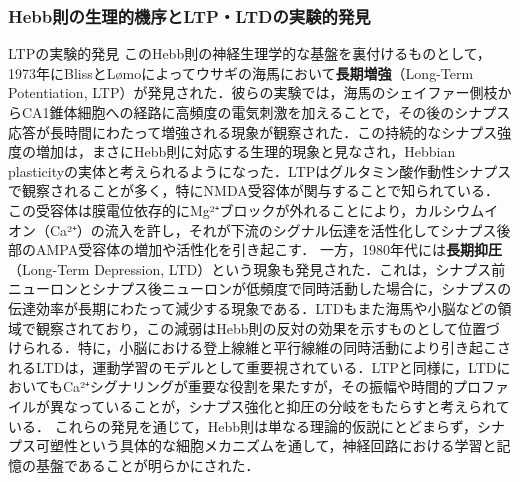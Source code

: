 \subsubsection{Hebb則の生理的機序とLTP・LTDの実験的発見}
LTPの実験的発見 \citep{Bliss1973-vj} \citep{Dudek1992-nz}
このHebb則の神経生理学的な基盤を裏付けるものとして，1973年にBlissとLømoによってウサギの海馬において\textbf{長期増強}（Long-Term Potentiation, LTP）が発見された．彼らの実験では，海馬のシェイファー側枝からCA1錐体細胞への経路に高頻度の電気刺激を加えることで，その後のシナプス応答が長時間にわたって増強される現象が観察された．この持続的なシナプス強度の増加は，まさにHebb則に対応する生理的現象と見なされ，Hebbian plasticityの実体と考えられるようになった．LTPはグルタミン酸作動性シナプスで観察されることが多く，特にNMDA受容体が関与することで知られている．この受容体は膜電位依存的にMg²⁺ブロックが外れることにより，カルシウムイオン（Ca²⁺）の流入を許し，それが下流のシグナル伝達を活性化してシナプス後部のAMPA受容体の増加や活性化を引き起こす．
一方，1980年代には\textbf{長期抑圧}（Long-Term Depression, LTD）という現象も発見された．これは，シナプス前ニューロンとシナプス後ニューロンが低頻度で同時活動した場合に，シナプスの伝達効率が長期にわたって減少する現象である．LTDもまた海馬や小脳などの領域で観察されており，この減弱はHebb則の反対の効果を示すものとして位置づけられる．特に，小脳における登上線維と平行線維の同時活動により引き起こされるLTDは，運動学習のモデルとして重要視されている．LTPと同様に，LTDにおいてもCa²⁺シグナリングが重要な役割を果たすが，その振幅や時間的プロファイルが異なっていることが，シナプス強化と抑圧の分岐をもたらすと考えられている．
これらの発見を通じて，Hebb則は単なる理論的仮説にとどまらず，シナプス可塑性という具体的な細胞メカニズムを通して，神経回路における学習と記憶の基盤であることが明らかにされた．
